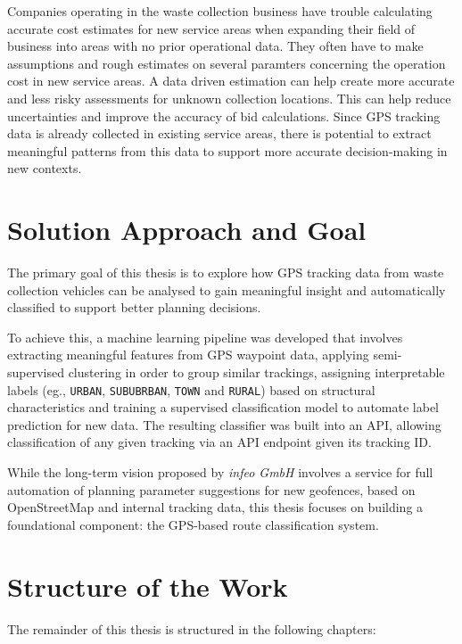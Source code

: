 \documentclass[a4paper,12pt,twoside]{scrreprt}
\begin{document}
Companies operating in the waste collection business have trouble calculating
accurate cost estimates for new service areas when expanding their field of
business into
areas with no prior operational data.
They
often have to make assumptions and rough estimates on several paramters
concerning the operation cost in new service areas. A data driven estimation
can help create more accurate and less risky assessments for unknown collection
locations. This can help reduce uncertainties and improve the accuracy of bid
calculations.
Since GPS tracking data is already collected in existing service
areas, there is potential to extract meaningful patterns from this data to
support more accurate decision-making in new contexts.

\section{Solution Approach and Goal}

The primary goal of this thesis is to explore how GPS tracking data from waste
collection vehicles can be analysed to gain meaningful insight and
automatically classified to support better planning decisions.

To achieve this, a machine learning pipeline was developed that
involves extracting meaningful features from GPS waypoint data, applying
semi-supervised clustering in order to group similar trackings, assigning
interpretable labels (eg., \texttt{URBAN}, \texttt{SUBUBRBAN}, \texttt{TOWN}
and
\texttt{RURAL}) based on structural characteristics and training a supervised
classification model to automate label prediction for new data.
The resulting classifier was built into an API, allowing classification of any
given tracking via an API endpoint given its tracking ID.

While the long-term vision proposed by \textit{infeo GmbH} involves a service
for full automation of planning parameter suggestions for new geofences, based
on OpenStreetMap and internal tracking data, this thesis focuses on building a
foundational component: the GPS-based route classification system.

\section{Structure of the Work}

The remainder of this thesis is structured in the following chapters:
\end{document}
